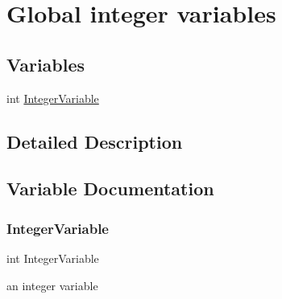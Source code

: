 \hypertarget{group__IntVariables}{}\section{Global integer variables}
\label{group__IntVariables}
\subsection*{Variables}
\begin{DoxyCompactItemize}
\item 
int \hyperlink{group__IntVariables_ga696271d39cb4783da8c122137f1fa08c}{Integer\+Variable}
\end{DoxyCompactItemize}


\subsection{Detailed Description}


\subsection{Variable Documentation}
\mbox{\label{group__IntVariables_ga696271d39cb4783da8c122137f1fa08c}} 
\subsubsection{\texorpdfstring{Integer\+Variable}{IntegerVariable}}
{\footnotesize\ttfamily int Integer\+Variable}

an integer variable 